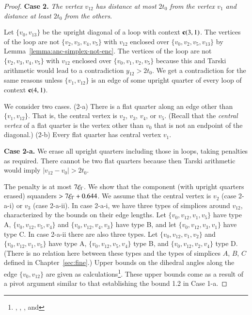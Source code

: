 \begin{proof}
\medskip

{\bf Case 2.} {\it The vertex $v_{12}$ has distance at most $2t_0$
from the vertex $v_1$ and distance at least $2t_0$ from the
others.}

Let $\{v_0,v_{13}\}$ be the upright diagonal of a loop with context ${\operatorname{\bf c}}{(3,1)}$.  The
vertices of the loop are not $\{v_2,v_3,v_4,v_5\}$ with $v_{12}$
enclosed over $\{v_0,v_2,v_5,v_{13}\}$ by
Lemma~\ref{lemma:anc-simplex-not-enc}. The vertices of the loop
are not $\{v_2,v_3,v_4,v_5\}$ with $v_{12}$ enclosed over
$\{v_0,v_1,v_2,v_5\}$ because this and Tarski arithmetic would lead to a contradiction
$y_{12}>2t_0$. 
We get a contradiction for the same reasons
 unless $\{v_1,v_{12}\}$ is an edge of some
upright quarter of every loop of context ${\operatorname{\bf c}}{(4,1)}$.

We consider two cases.  (2-a) There is a flat quarter along an
edge other than $\{v_1,v_{12}\}$.  That is, the central vertex is
$v_2$, $v_3$, $v_4$, or $v_5$.  (Recall that the {\it central
vertex} of a flat quarter is the vertex other than $v_0$ that
is not an endpoint of the diagonal.) (2-b) Every flat quarter has
central vertex $v_1$.

{\bf Case 2-a.}  We erase all upright quarters including those in
loops, taking penalties as required. There cannot be two flat
quarters because then Tarski arithmetic would imply $|v_{12}-v_0|>2t_0$.

The penalty is at most $7\xi_\Gamma$.  We show that the component (with
upright quarters erased) squanders $>7\xi_\Gamma+0.644$.  We assume that
the central vertex is $v_2$ (case 2-a-i) or $v_3$ (case 2-a-ii).
In case 2-a-i, we have three types of simplices around $v_{12}$,
characterized by the bounds on their edge lengths.  Let
$\{v_0,v_{12},v_1,v_5\}$ have type A, $\{v_0,v_{12},v_5,v_4\}$ and
$\{v_0,v_{12},v_4,v_3\}$ have type B, and let $\{v_0,v_{12},v_3,v_1\}$
have type C.  In case 2-a-ii there are also three types.  Let
$\{v_0,v_{12},v_1,v_2\}$ and $\{v_0,v_{12},v_1,v_5\}$ have type A,
$\{v_0,v_{12},v_5,v_4\}$ type B, and $\{v_0,v_{12},v_2,v_4\}$ type D.
(There is no relation here between these types and the types of
simplices $A$, $B$, $C$ defined in Chapter~\ref{sec:fine}.) Upper
bounds on the dihedral angles along the edge $\{v_0,v_{12}\}$ are
given as calculations\footnote{, ,
, and }. These upper bounds come
as a result of a pivot argument similar to that establishing the
bound 1.2 in Case 1-a.


\end{proof}
